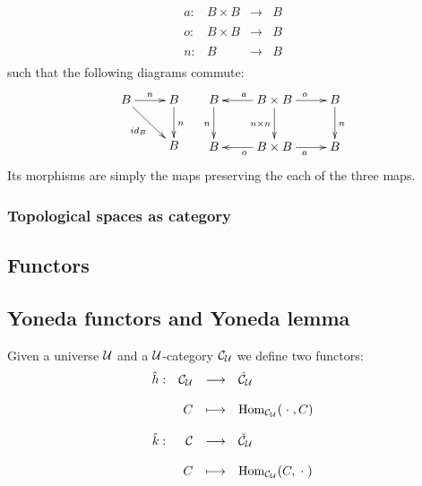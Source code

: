 \begin{enumerate}
$$\begin{array}{rrcl}
a : & B \times B & \longrightarrow& B\\
&&&\\
o : & B \times B & \longrightarrow& B\\
&&&\\
n : & B &\longrightarrow& B\\
\end{array}$$
such that the following diagrams commute:
$$\begin{array}{cc}
\xymatrix{
B \ar[rd]_{id_B}\ar[r]^n&B\ar[d]^n\\
&B\\
} &
\xymatrix{
B \ar[d]_n & B \times B \ar[l]_a \ar[r]^o \ar[d]_{n \times n} & B\ar[d]^n\\
B & B \times B \ar[l]^o \ar[r]_a &B\\
}\\
\end{array}$$
Its morphisms are simply the maps preserving the each of the three maps.
\end{enumerate}
\subsubsection{Topological spaces as category}

\subsection{Functors}

\subsection{Yoneda functors and Yoneda lemma}
Given a universe $\mathcal{U}$ and a $\mathcal{U}$-category $\mathcal{C}_{\mathcal{U}}$ we define two functors:
$$\begin{array}{rrcl}
\hat{h} : &\mathcal{C}_{\mathcal{U}} &\longrightarrow& \hat{\mathcal{C}}_{\mathcal{U}}\\
&&&\\
&C& \longmapsto& \mathrm{Hom}_{\mathcal{C}_{\mathcal{U}}}(\;\cdot\;,C)\\
&&&\\
\hat{k} :&\mathcal{C} &\longrightarrow& \check{\mathcal{C}}_{\mathcal{U}}\\
&&&\\
&C&\longmapsto&\mathrm{Hom}_{\mathcal{C}_{\mathcal{U}}}(C,\;\cdot\;)\\
\end{array}$$



